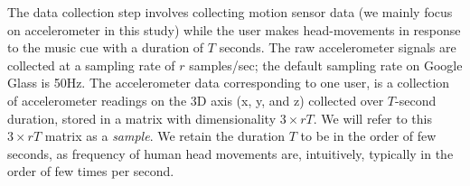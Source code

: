 The data collection step involves collecting motion sensor data (we mainly focus on accelerometer in this study) while the user makes head-movements
in response to the music cue  with a duration of $T$ seconds.
The raw accelerometer
signals are collected at
a sampling rate of $r$ samples/sec; the default sampling rate on
Google Glass is 50Hz. The accelerometer data corresponding to one user,  is a
collection of accelerometer readings on the
3D axis (x, y, and z) collected over $T$-second duration, 
stored in a matrix with dimensionality $3\times rT$. %
We will refer to this $3\times rT$ matrix as a {\em sample}.
We retain the duration $T$ to be in the order of few seconds, as frequency of
human head movements are, intuitively, typically in the order of few times per
second. %





